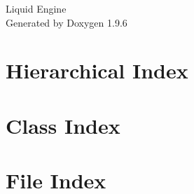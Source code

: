 \documentclass[twoside]{book}
\newcommand{\+}{\discretionary{\mbox{\scriptsize$\hookleftarrow$}}{}{}}
\newcommand{\clearemptydoublepage}{%
    \newpage{\pagestyle{empty}\cleardoublepage}%
  }
\begin{document}
  \raggedbottom
    \hypersetup{pageanchor=false,
                bookmarksnumbered=true,
                pdfencoding=unicode
               }
  \begin{titlepage}
  \vspace*{7cm}
  \begin{center}%
  {\Large Liquid Engine}\\
  \vspace*{1cm}
  {\large Generated by Doxygen 1.9.6}\\
  \end{center}
  \end{titlepage}
  \clearemptydoublepage
  \tableofcontents
  \clearemptydoublepage
  \hypersetup{pageanchor=true}
\chapter{Hierarchical Index}

\chapter{Class Index}

\chapter{File Index}

\end{document}
